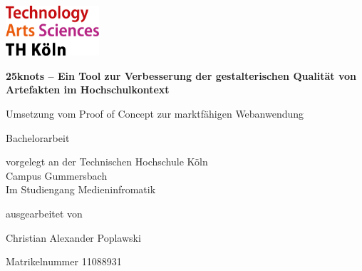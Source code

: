 \begin{titlepage}

\begin{center}

\begin{flushleft}
\includegraphics[width=0.26\textwidth]{images/logo_th.jpg}
\end{flushleft}

\vspace{1.6cm}

{\Large\textbf{25knots – Ein Tool zur Verbesserung der gestalterischen Qualität von Artefakten im Hochschulkontext}\par}
\vspace{0.5cm}
\begin{large}
Umsetzung vom Proof of Concept zur marktfähigen Webanwendung
\end{large}

\vspace{1.6cm}

\begin{LARGE}
\begin{scshape}
Bachelorarbeit\\
\end{scshape}
\end{LARGE}

\vspace{0.8cm}

\begin{large}
vorgelegt an der Technischen Hochschule Köln\\
Campus Gummersbach\\
Im Studiengang Medieninfromatik\\
\end{large}
\vspace{0.8cm}

ausgearbeitet von\\
\vspace{0.2cm}
\begin{large}
Christian Alexander Poplawski\\
\begin{scshape}
Matrikelnummer 11088931
\end{scshape}
\end{large}


\end{center}
\end{titlepage}
